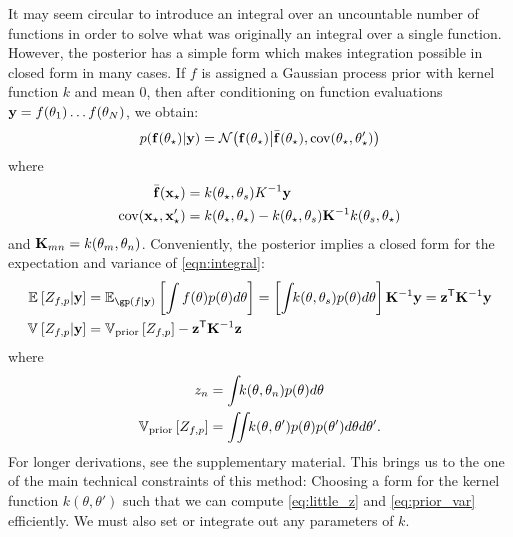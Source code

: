 It may seem circular to introduce an integral over an uncountable number of functions in order to solve what was originally an integral over a single function.  However, the \gp posterior has a simple form which makes integration possible in closed form in many cases.  If $f$ is assigned a Gaussian process prior with kernel function $k$ and mean $0$, then after conditioning on function evaluations ${\bf{y}} = f(\theta_1) \dots f(\theta_N)$, we obtain:
%
\begin{align}
p({\bf{f}}(\theta_\star)|{\bf{y}}) = \mathcal{N}\!\left({\bf{f}}(\theta_\star) \middle| \bar{{\bf{f}}}(\theta_\star),\operatorname{cov}(\theta_\star,\theta_\star')\right)
\end{align}
where
\begin{align}
\label{eq:gp_mean} \bar{{\bf{f}}}({\bf{x}}_\star) & = k(\theta_\star, \theta_s) K^{-1} {\bf{y}} \\
\label{eq:gp_var}\operatorname{cov}({\bf{x}}_\star, {\bf{x}}_\star') & = k(\theta_\star,\theta_\star) - k(\theta_\star, {\bf{\theta}}_s) \mathbf{K}^{-1} k({\bf{\theta}}_s, \theta_\star)
\end{align} 
%
and $\mathbf{K}_{mn} = k(\theta_m, \theta_n)$. 
%
Conveniently, the \gp{} posterior implies a closed form for the expectation and variance of \eqref{eqn:integral}:
%
%
\begin{align}
\expectargs{}{Z_{f,p} | \vy }&  = \expectargs{\gp(\lf | \vy )}{\int \lf(\theta)p(\theta)d\theta} %
 = \left[ \int\!\! k(\theta, \vtheta_s) p(\theta) d\theta \right] \vK^{-1} \vy = \vz\tra \vK^{-1} \vy
\label{eq:gp_mean_symbolic} \\
\varianceargs{}{Z_{f,p}| \vy} & = \varianceargs{\textrm{prior}}{Z_{f,p}} - \vz\tra \vK^{-1} \vz
\label{eq:marg_var_symbolic}
\end{align}
where 
\begin{align}
z_n & = \int\!\! k(\theta, \theta_n) p(\theta) d\theta \label{eq:little_z}\\
\mathbb{V}_{\textrm{prior}} \left[ {Z_{f,p}} \right] &  = \int\!\!\! \int\!\! k(\theta, \theta') p(\theta) p(\theta') d\theta d\theta' \label{eq:prior_var}.
\end{align}
For longer derivations, see the supplementary material.  This brings us to the one of the main technical constraints of this method:  Choosing a form for the kernel function $k(\theta, \theta')$ such that we can compute \eqref{eq:little_z} and \eqref{eq:prior_var} efficiently.  We must also set or integrate out any parameters of $k$.
%


